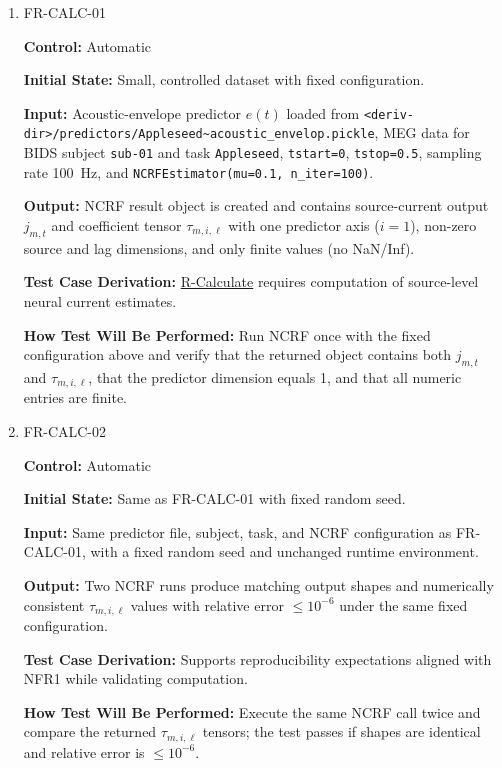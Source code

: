 \documentclass[12pt, titlepage]{article}
\begin{document}
\begin{enumerate}

\item{FR-CALC-01\\}

\textbf{Control:} Automatic

\textbf{Initial State:} Small, controlled dataset with fixed configuration.

\textbf{Input:} Acoustic-envelope predictor $e(t)$ loaded from \texttt{<deriv-dir>/predictors/Appleseed\textasciitilde acoustic\_envelop.pickle}, MEG data for BIDS subject \texttt{sub-01} and task \texttt{Appleseed}, \texttt{tstart=0}, \texttt{tstop=0.5}, sampling rate \SI{100}{Hz}, and \texttt{NCRFEstimator(mu=0.1, n\_iter=100)}.

\textbf{Output:} NCRF result object is created and contains source-current output $j_{m,t}$ and coefficient tensor $\tau_{m,i,\ell}$ with one predictor axis (\(i=1\)), non-zero source and lag dimensions, and only finite values (no NaN/Inf).

\textbf{Test Case Derivation:} \hyperref[R-Calculate]{R-Calculate} requires computation of source-level neural current estimates.

\textbf{How Test Will Be Performed:} Run NCRF once with the fixed configuration above and verify that the returned object contains both $j_{m,t}$ and $\tau_{m,i,\ell}$, that the predictor dimension equals 1, and that all numeric entries are finite.

\item{FR-CALC-02\\}

\textbf{Control:} Automatic

\textbf{Initial State:} Same as FR-CALC-01 with fixed random seed.

\textbf{Input:} Same predictor file, subject, task, and NCRF configuration as FR-CALC-01, with a fixed random seed and unchanged runtime environment.

\textbf{Output:} Two NCRF runs produce matching output shapes and numerically consistent $\tau_{m,i,\ell}$ values with relative error $\leq 10^{-6}$ under the same fixed configuration.

\textbf{Test Case Derivation:} Supports reproducibility expectations aligned with NFR1 while validating computation.

\textbf{How Test Will Be Performed:} Execute the same NCRF call twice and compare the returned $\tau_{m,i,\ell}$ tensors; the test passes if shapes are identical and relative error is $\leq 10^{-6}$.

\end{enumerate}
\end{document}
